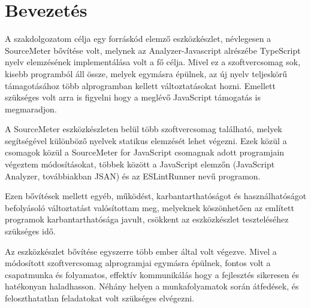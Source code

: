 \chapter{Bevezetés}
\label{chap:intro}

\noindent 
A szakdolgozatom célja egy forráskód elemző eszközkészlet, névlegesen a SourceMeter bővítése volt, melynek az Analyzer-Javascript alrészébe TypeScript \cite{nance2014typescript}\cite{fenton2017pro}\cite{cherny2019programming}\cite{10.1007/978-3-662-44202-9_11} nyelv elemzésének implementálása volt a fő célja.
Mivel ez a szoftvercsomag sok, kisebb programból áll össze, melyek egymásra épülnek, az új nyelv teljeskörű támagotásához több alprogramban kellett változtatásokat hozni. Emellett szükséges volt arra is figyelni hogy a meglévő JavaScript támogatás is megmaradjon.

A SourceMeter eszközkészleten belül több szoftvercsomag található, melyek segítségével különböző nyelvek statikus elemzését lehet végezni. Ezek közül a csomagok közül a SourceMeter for JavaScript csomagnak adott programjain végeztem módosításokat, többek között a JavaScript elemzőn (JavaScript Analyzer, továbbiakban JSAN) és az ESLintRunner nevű programon. 

Ezen bővítések mellett egyéb, működést, karbantarthatóságot és használhatóságot befolyásoló változtatást valósítottam meg, melyeknek köszönhetően az említett programok karbantarthatósága javult, csökkent az eszközkészlet teszteléséhez szükséges idő.

Az eszközkészlet bővítése egyszerre több ember által volt végezve. Mivel a módosított szoftvercsomag alprogramjai egymásra épülnek, fontos volt a csapatmunka és folyamatos, effektív kommunikálás hogy a fejlesztés sikeresen és hatékonyan haladhasson. Néhány helyen a munkafolyamatok során átfedések, és feloszthatatlan feladatokat volt szükséges elvégezni. 